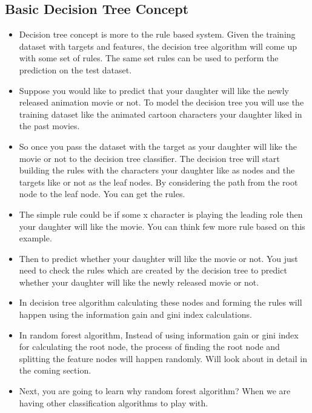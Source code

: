 %
%
%
%
%

\subsection*{Basic Decision Tree Concept}
\begin{itemize}
	\item Decision tree concept is more to the rule based system. Given the training dataset with targets and features, the decision tree algorithm will come up with some set of rules. The same set rules can be used to perform the prediction on the test dataset.
	
\item Suppose you would like to predict that your daughter will like the newly released animation movie or not. To model the decision tree you will use the training dataset like the animated cartoon characters your daughter liked in the past movies.
	
\item So once you pass the dataset with the target as your daughter will like the movie or not to the decision tree classifier. The decision tree will start building the rules with the characters your daughter like as nodes and the targets like or not as the leaf nodes. By considering the path from the root node to the leaf node. You can get the rules.
	
\item The simple rule could be if some x character is playing the leading role then your daughter will like the movie. You can think few more rule based on this example.
	
\item Then to predict whether your daughter will like the movie or not. You just need to check the rules which are created by the decision tree to predict whether your daughter will like the newly released movie or not.
\item In decision tree algorithm calculating these nodes and forming the rules will happen using the information gain and gini index calculations.

\item In random forest algorithm, Instead of using information gain or gini index for calculating the root node, the process of finding the root node and splitting the feature nodes will happen randomly. Will look about in detail in the coming section.

\item Next, you are going to learn why random forest algorithm? When we are having other classification algorithms to play with.
\end{itemize}


